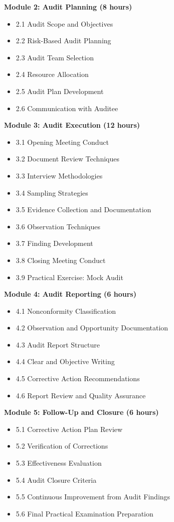 \documentclass[11pt,a4paper]{article}
\begin{document}
\textbf{Module 2: Audit Planning (8 hours)}
\begin{itemize}
\item 2.1 Audit Scope and Objectives
\item 2.2 Risk-Based Audit Planning
\item 2.3 Audit Team Selection
\item 2.4 Resource Allocation
\item 2.5 Audit Plan Development
\item 2.6 Communication with Auditee
\end{itemize}

\textbf{Module 3: Audit Execution (12 hours)}
\begin{itemize}
\item 3.1 Opening Meeting Conduct
\item 3.2 Document Review Techniques
\item 3.3 Interview Methodologies
\item 3.4 Sampling Strategies
\item 3.5 Evidence Collection and Documentation
\item 3.6 Observation Techniques
\item 3.7 Finding Development
\item 3.8 Closing Meeting Conduct
\item 3.9 Practical Exercise: Mock Audit
\end{itemize}

\textbf{Module 4: Audit Reporting (6 hours)}
\begin{itemize}
\item 4.1 Nonconformity Classification
\item 4.2 Observation and Opportunity Documentation
\item 4.3 Audit Report Structure
\item 4.4 Clear and Objective Writing
\item 4.5 Corrective Action Recommendations
\item 4.6 Report Review and Quality Assurance
\end{itemize}

\textbf{Module 5: Follow-Up and Closure (6 hours)}
\begin{itemize}
\item 5.1 Corrective Action Plan Review
\item 5.2 Verification of Corrections
\item 5.3 Effectiveness Evaluation
\item 5.4 Audit Closure Criteria
\item 5.5 Continuous Improvement from Audit Findings
\item 5.6 Final Practical Examination Preparation
\end{itemize}
\end{document}

